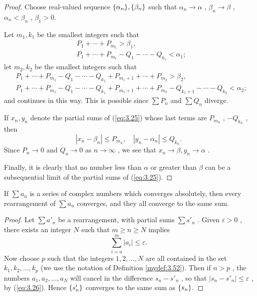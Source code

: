 \begin{proof}
    Choose real-valued sequence $\protect\{\alpha_n\}, \protect\{\beta_n\}$ such that $\alpha_n \rightarrow \alpha$ , $\beta_n \rightarrow \beta$ ,
    $\alpha_n < \beta_n$ , $\beta_1 > 0$.
    
    Let $m_1, k_1$ be the smallest integers such that
    \begin{align*}
        &P_1 + \cdots + P_{m_1} > \beta_1,\\
        &P_1 + \cdots + P_{m_1} - Q_1 - \cdots - Q_{k_1} < \alpha_1;
    \end{align*}
    let $m_2, k_2$ be the smallest integers such that
    \begin{align*}
        &P_1 + \cdots + P_{m_1} - Q_1 - \cdots - Q_{k_1} + P_{m_1 + 1} + \cdots + P_{m_2} > \beta_2,\\
        &P_1 + \cdots + P_{m_1} - Q_1 - \cdots - Q_{k_1} + P_{m_1 + 1} + \cdots + P_{m_2} - Q_{k_1 + 1} - \cdots - Q_{k_2} < \alpha_2;
    \end{align*}
    and continues in this way. This is possible since 
    $\sum P_n$ and 
    $\sum Q_n$ diverge.

    If $x_n, y_n$ denote the partial sums of (\ref{eq:3.25}) whose last terms are $P_{m_n}$ , $-Q_{k_n}$ , then 
    \begin{equation*}
        \left| x_n - \beta_n \right| \leq P_{m_n}, \quad
        \left| y_n - \alpha_n \right| \leq Q_{k_n}.
    \end{equation*}
    Since $P_n \rightarrow 0$ and $Q_n \rightarrow 0$ as $n \rightarrow \infty$ , we see that $x_n \rightarrow \beta, y_n \rightarrow \alpha$ .

    Finally, it is clearly that no number less than $\alpha$ or greater than $\beta$ can be a subsequential limit of the partial sums of (\ref{eq:3.25}).
\end{proof}

\begin{thm}
    \label{thm:3.55}
    If $\sum a_n$ is a series of complex numbers which converges absolutely,
    then every rearrangement of $\sum a_n$ converges,
    and they all converge to the same sum.
\end{thm}

\begin{proof}
    Let $\sum a'_n$ be a rearrangement, with partial sums $\sum s'_n$ .
    Given $\varepsilon > 0$ ,
    there exists an integer $N$ such that $m \geq n \geq N$ implies
    \begin{equation}
        \label{eq:3.26}
        \sum_{i=n}^{m} \left| a_i \right| \leq \varepsilon.
    \end{equation}
    Now choose $p$ such that the integers $1,2,\dots,N$ are all contained in the set $k_1, k_2, \dots, k_p$ 
    (we use the notation of Definition \ref{mydef:3.52}).
    Then if $n>p$ , the numbers $a_1, a_2, \dots, a_N$ will cancel in the difference $s_n - s'_n$ , 
    so that $\left| s_n - s'_n \right| \leq \varepsilon$ , by (\ref{eq:3.26}).
    Hence $\protect\{s'_n\}$ converges to the same sum as $\protect\{s_n\}.$  
\end{proof}